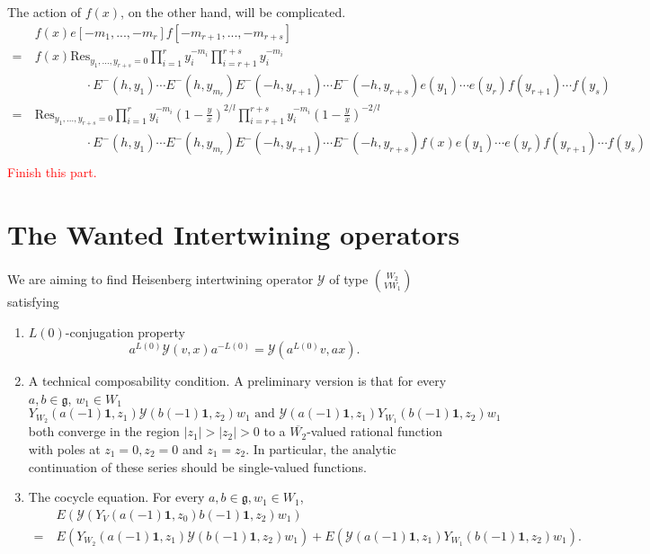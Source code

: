 \documentclass[11pt,oneside,reqno]{amsart}
\theoremstyle{definition}
\newcommand{\Y}{{\mathcal Y}}
\newcommand{\one}{\mathbf{1}}
\newcommand{\Res}{\text{Res}}
\begin{document}
The action of $f(x)$, on the other hand, will be complicated. 
\begin{align*}
    & f(x)e[-m_1, ..., -m_r]f[-m_{r+1}, ..., -m_{r+s}] \\
    = \ & f(x) \Res_{y_1, ...,  y_{r+s} = 0} \prod_{i=1}^r y_i^{-m_i} \prod_{i=r+1}^{r+s} y_i^{-m_i} \\
    & \qquad \qquad \cdot E^-(h, y_1) \cdots E^-(h, y_{m_r}) E^-(-h, y_{r+1}) \cdots E^-(-h, y_{r+s})e(y_1) \cdots e(y_r) f(y_{r+1}) \cdots f(y_s)\\
    = \ & \Res_{y_1, ...,  y_{r+s} = 0} \prod_{i=1}^{r}y_i^{-m_i} \left(1-\frac y x\right)^{2/l} \prod_{i=r+1}^{r+s}y_i^{-m_i} \left(1-\frac y x\right)^{-2/l} \\
    & \qquad \qquad \cdot E^-(h, y_1) \cdots E^-(h, y_{m_r}) E^-(-h, y_{r+1}) \cdots E^-(-h, y_{r+s})f(x)e(y_1) \cdots e(y_r) f(y_{r+1}) \cdots f(y_s)\\
\end{align*}
\textcolor{red}{Finish this part. }

\section{The Wanted Intertwining operators}

We are aiming to find Heisenberg intertwining operator $\Y$ of type $\binom{W_2}{VW_1}$ satisfying 

\begin{enumerate}
    \item $L(0)$-conjugation property
$$a^{L(0)}\Y(v,x)a^{-L(0)} = \Y(a^{L(0)}v, ax).$$
    \item A technical composability condition. A preliminary version is that for every $a,b\in \mathfrak{g}$, $w_1\in W_1$
    $$Y_{W_2}(a(-1)\one, z_1) \Y(b(-1)\one, z_2) w_1 \text{ and } \Y(a(-1)\one, z_1) Y_{W_1}(b(-1)\one, z_2) w_1 $$
    both converge in the region $|z_1|>|z_2|>0$ to a $\overline{W_2}$-valued rational function with poles at $z_1=0, z_2=0$ and $z_1=z_2$. In particular, the analytic continuation of these series should be single-valued functions. 
    \item The cocycle equation. For every $a, b\in \mathfrak{g}, w_1\in W_1$, 
    \begin{align*}
        & E(\Y(Y_V(a(-1)\one, z_0)b(-1)\one, z_2)w_1) \\
        = \ & E(Y_{W_2}(a(-1)\one, z_1) \Y(b(-1)\one, z_2) w_1) + E(\Y(a(-1)\one, z_1) Y_{W_1}(b(-1)\one, z_2) w_1).
    \end{align*}
\end{enumerate}
\end{document}
